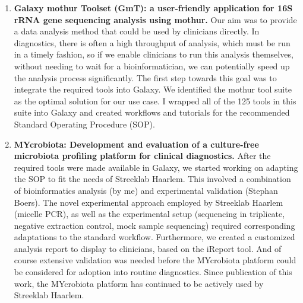 \begin{enumerate}[label=\ref{chapter:microbiota}.\arabic*]
\itemsep-0.5em
\setcounter{enumi}{-1}
\item \textbf{Galaxy mothur Toolset (GmT): a user-friendly application for 16S rRNA gene sequencing analysis using mothur.}
Our aim was to provide a data analysis method that could be used by clinicians directly. In diagnostics, there is often a high throughput of analysis, which must be run in a timely fashion, so if we enable clinicians to run this analysis themselves, without needing to wait for a bioinformatician, we can potentially speed up the analysis process significantly. The first step towards this goal was to integrate the required tools into Galaxy. We identified the mothur tool suite as the optimal solution for our use case. I wrapped all of the 125 tools in this suite into Galaxy and created workflows and tutorials for the recommended Standard Operating Procedure (SOP).

\item \textbf{MYcrobiota: Development and evaluation of a culture-free microbiota profiling platform for clinical diagnostics.} After the required tools were made available in Galaxy, we started working on adapting the SOP to fit the needs of Streeklab Haarlem. This involved a combination of bioinformatics analysis (by me) and experimental validation (Stephan Boers). The novel experimental approach employed by Streeklab Haarlem (micelle PCR), as well as the experimental setup (sequencing in triplicate, negative extraction control, mock sample sequencing) required corresponding adaptations to the standard workflow. Furthermore, we created a customized analysis report to display to clinicians, based on the iReport tool. And of course extensive validation was needed before the MYcrobiota platform could be considered for adoption into routine diagnostics. Since publication of this work, the MYcrobiota platform has continued to be actively used by Streeklab Haarlem.

\end{enumerate}


